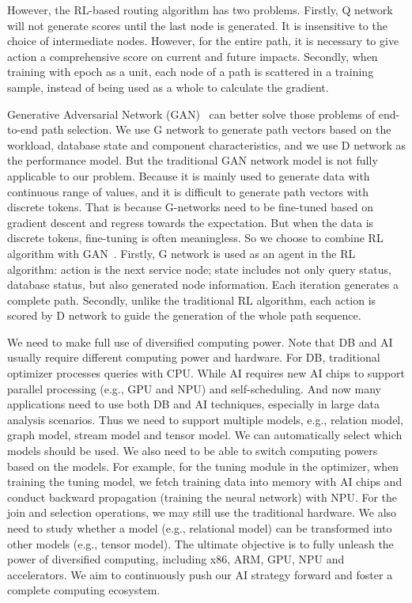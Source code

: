However, the RL-based routing algorithm has two problems. 
Firstly, Q network will not generate scores until the last node is generated. It is insensitive to the choice of intermediate nodes. However, for the entire path, it is necessary to give action a comprehensive score on current and future impacts. 
Secondly, when training with epoch as a unit, each node of a path is scattered in a training sample, instead of being used as a whole to calculate the gradient. 

Generative Adversarial Network (GAN)~\cite{DBLP:journals/corr/abs-1902-05687} can better solve those problems of end-to-end path selection. We use G network to generate path vectors based on the workload, database state and component characteristics, and we use D network as the performance model. 
But the traditional GAN network model is not fully applicable to our problem. Because it is mainly used to generate data with continuous range of values, and it is difficult to generate path vectors with discrete tokens. That is because G-networks need to be fine-tuned based on gradient descent and regress towards the expectation. But when the data is discrete tokens, fine-tuning is often meaningless. So we choose to combine RL algorithm with GAN~\cite{DBLP:conf/aaai/YuZWY17}. Firstly, G network is used as an agent in the RL algorithm: action is the next service node; state includes not only query status, database status, but also generated node information. Each iteration generates a complete path. Secondly, unlike the traditional RL algorithm, each action is scored by D network to guide the generation of the whole path sequence.

 We need to make full use of diversified computing power. Note that DB and AI usually require different computing power and hardware. For DB, traditional optimizer processes queries with CPU. While AI requires new AI chips to support parallel processing (e.g., GPU and NPU) and self-scheduling. And now many applications need to use both DB and AI techniques, especially in large data analysis scenarios. 
Thus we need to support multiple models, e.g., relation model, graph model, stream model and tensor model. We can automatically select which models should be used. We also need to be able to switch computing powers based on the models. For example, for the tuning module in the optimizer, when training the tuning model, we fetch training data into memory with AI chips and conduct backward propagation (training the neural network) with NPU. For the join and selection operations, we may still use the traditional hardware. We also need to study whether a model (e.g., relational model) can be transformed into other models (e.g., tensor model).  The ultimate objective is to fully unleash the power of diversified computing, including x86, ARM, GPU, NPU and accelerators. We aim to continuously push our AI strategy forward and foster a complete computing ecosystem. 


